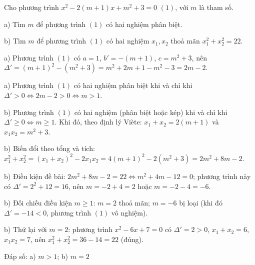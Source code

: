\begin{problem}[9DS-PT2-007]
Cho phương trình $x^2 - 2(m + 1)x + m^2 + 3 = 0$ $(1)$, với $m$ là tham số.

a) Tìm $m$ để phương trình $(1)$ có hai nghiệm phân biệt.

b) Tìm $m$ để phương trình $(1)$ có hai nghiệm $x_1, x_2$ thoả mãn $x_1^2 + x_2^2 = 22$.

\begin{solution}
a) Phương trình $(1)$ có $a = 1$, $b' = -(m + 1)$, $c = m^2 + 3$, nên $\Delta' = (m + 1)^2 - (m^2 + 3) = m^2 + 2m + 1 - m^2 - 3 = 2m - 2$.

a) Phương trình $(1)$ có hai nghiệm phân biệt khi và chỉ khi $\Delta' > 0 \Leftrightarrow 2m - 2 > 0 \Leftrightarrow m > 1$.

b) Phương trình $(1)$ có hai nghiệm (phân biệt hoặc kép) khi và chỉ khi $\Delta' \geq 0 \Leftrightarrow m \geq 1$. Khi đó, theo định lý Viète: $x_1 + x_2 = 2(m + 1)$ và $x_1 x_2 = m^2 + 3$.

b) Biến đổi theo tổng và tích: $x_1^2 + x_2^2 = (x_1 + x_2)^2 - 2x_1x_2 = 4(m + 1)^2 - 2(m^2 + 3) = 2m^2 + 8m - 2$.

b) Điều kiện đề bài: $2m^2 + 8m - 2 = 22 \Leftrightarrow m^2 + 4m - 12 = 0$; phương trình này có $\Delta' = 2^2 + 12 = 16$, nên $m = -2 + 4 = 2$ hoặc $m = -2 - 4 = -6$.

b) Đối chiếu điều kiện $m \geq 1$: $m = 2$ thoả mãn; $m = -6$ bị loại (khi đó $\Delta' = -14 < 0$, phương trình $(1)$ vô nghiệm).

b) Thử lại với $m = 2$: phương trình $x^2 - 6x + 7 = 0$ có $\Delta' = 2 > 0$, $x_1 + x_2 = 6$, $x_1x_2 = 7$, nên $x_1^2 + x_2^2 = 36 - 14 = 22$ (đúng).

Đáp số: a) $\boxed{m > 1}$; b) $\boxed{m = 2}$
\end{solution}
\end{problem}

